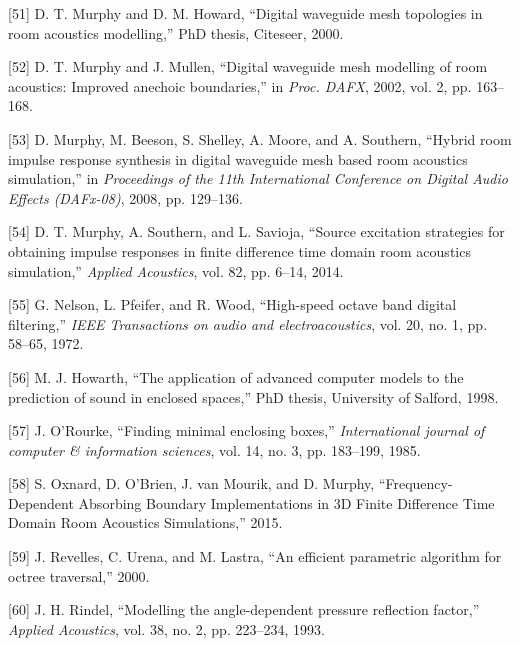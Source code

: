 \documentclass[]{scrreprt}
\begin{document}
\hypertarget{ref-murphyux5fdigitalux5f2000}{}
{[}51{]} D. T. Murphy and D. M. Howard, ``Digital waveguide mesh
topologies in room acoustics modelling,'' PhD thesis, Citeseer, 2000.

\hypertarget{ref-murphyux5fdigitalux5f2002}{}
{[}52{]} D. T. Murphy and J. Mullen, ``Digital waveguide mesh modelling
of room acoustics: Improved anechoic boundaries,'' in \emph{Proc. DAFX},
2002, vol. 2, pp. 163--168.

\hypertarget{ref-murphyux5fhybridux5f2008}{}
{[}53{]} D. Murphy, M. Beeson, S. Shelley, A. Moore, and A. Southern,
``Hybrid room impulse response synthesis in digital waveguide mesh based
room acoustics simulation,'' in \emph{Proceedings of the 11th
International Conference on Digital Audio Effects (DAFx-08)}, 2008, pp.
129--136.

\hypertarget{ref-murphyux5fsourceux5f2014}{}
{[}54{]} D. T. Murphy, A. Southern, and L. Savioja, ``Source excitation
strategies for obtaining impulse responses in finite difference time
domain room acoustics simulation,'' \emph{Applied Acoustics}, vol. 82,
pp. 6--14, 2014.

\hypertarget{ref-nelsonux5fhigh-speedux5f1972}{}
{[}55{]} G. Nelson, L. Pfeifer, and R. Wood, ``High-speed octave band
digital filtering,'' \emph{IEEE Transactions on audio and
electroacoustics}, vol. 20, no. 1, pp. 58--65, 1972.

\hypertarget{ref-howarthux5fapplicationux5f1998}{}
{[}56{]} M. J. Howarth, ``The application of advanced computer models to
the prediction of sound in enclosed spaces,'' PhD thesis, University of
Salford, 1998.

\hypertarget{ref-orourkeux5ffindingux5f1985}{}
{[}57{]} J. O'Rourke, ``Finding minimal enclosing boxes,''
\emph{International journal of computer \& information sciences}, vol.
14, no. 3, pp. 183--199, 1985.

\hypertarget{ref-oxnardux5ffrequency-dependentux5f2015}{}
{[}58{]} S. Oxnard, D. O'Brien, J. van Mourik, and D. Murphy,
``Frequency-Dependent Absorbing Boundary Implementations in 3D Finite
Difference Time Domain Room Acoustics Simulations,'' 2015.

\hypertarget{ref-revellesux5fefficientux5f2000}{}
{[}59{]} J. Revelles, C. Urena, and M. Lastra, ``An efficient parametric
algorithm for octree traversal,'' 2000.

\hypertarget{ref-rindelux5fmodellingux5f1993}{}
{[}60{]} J. H. Rindel, ``Modelling the angle-dependent pressure
reflection factor,'' \emph{Applied Acoustics}, vol. 38, no. 2, pp.
223--234, 1993.
\end{document}
